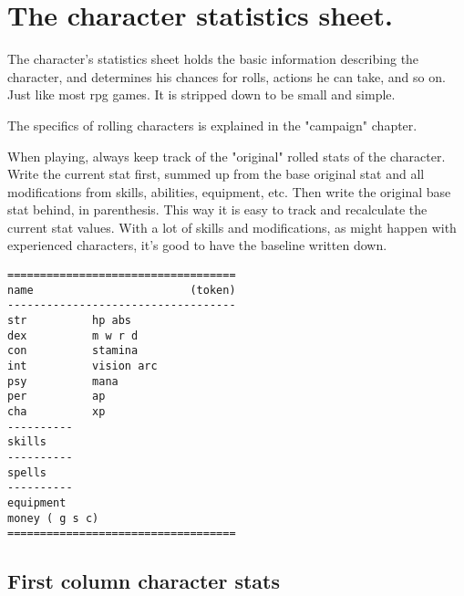 \section*{The character statistics sheet.}

The character's statistics sheet holds the basic information describing the character, and determines his chances for rolls, actions he can take, and so on. Just like most rpg games. It is stripped down to be small and simple.

The specifics of rolling characters is explained in the "campaign" chapter.

When playing, always keep track of the "original" rolled stats of the character. Write the current stat first, summed up from the base original stat and all modifications from skills, abilities, equipment, etc. Then write the original base stat behind, in parenthesis. This way it is easy to track and recalculate the current stat values. With a lot of skills and modifications, as might happen with experienced characters, it's good to have the baseline written down.

\goodbreak
\begin{samepage} \begin{verbatim}
===================================
name                        (token)
-----------------------------------
str          hp abs
dex          m w r d
con          stamina
int          vision arc
psy          mana
per          ap
cha          xp
----------
skills
----------
spells
----------
equipment
money ( g s c)
===================================
\end{verbatim} \end{samepage}


\subsection*{First column character stats}


